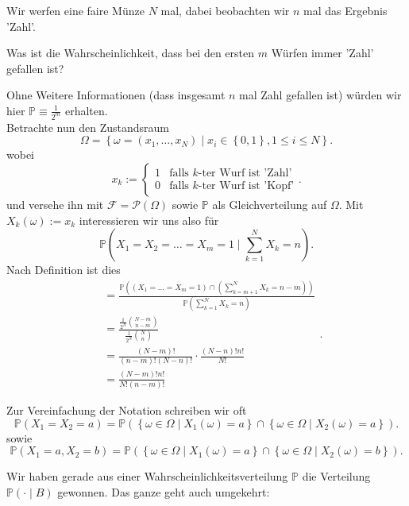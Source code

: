 \begin{example}
    Wir werfen eine faire Münze $N$ mal, dabei beobachten wir $n$ mal das Ergebnis 'Zahl'.
     \begin{question}
        Was ist die Wahrscheinlichkeit, dass bei den ersten $m$ Würfen immer 'Zahl' gefallen ist?
    \end{question}
    Ohne Weitere Informationen (dass insgesamt $n$ mal Zahl gefallen ist) würden wir hier $\mathbb{P} \equiv \frac{1}{2^m}$ erhalten. \\
    Betrachte nun den Zustandsraum
    \[
        \Omega = \left \{\omega = (x_1,\ldots,x_N)\mid x_i \in \left \{0,1\right\},1\leq i\leq N \right\} 
    .\] 
    wobei
    \[
    x_k := \begin{cases}
        1 & \text{falls $k$-ter Wurf ist 'Zahl'} \\
        0 & \text{falls $k$-ter Wurf ist 'Kopf'}
    \end{cases}
    .\] 
    und versehe ihn mit $\mathcal{F} = \mathcal{P}(\Omega)$ sowie $\mathbb{P}$ als Gleichverteilung auf $\Omega$. Mit $X_k(\omega) := x_k$ interessieren wir uns also für
    \[
        \mathbb{P}\left(X_1=X_2=\ldots=X_m =1 \mid  \sum_{k=1}^N X_k  =n\right)
    .\]
    Nach Definition ist dies
    \[
        \begin{split}
        &= \frac{\mathbb{P}\left(\left(X_1=\ldots=X_m = 1\right) \cap  \left(\sum\limits_{k=m+1}^N X_k = n-m\right)\right)}{\mathbb{P}\left(\sum\limits_{k=1}^N X_k = n\right)} \\
        &= \frac{\frac{1}{2^N} \binom{N-m}{n-m}}{\frac{1}{2^N}\binom{N}{n}} \\
        &= \frac{(N-m)!}{(n-m)!(N-n)!} \cdot  \frac{(N-n)! n!}{N!} \\
        &= \frac{(N-m)! n!}{N! (n-m)!}
        \end{split}
    .\] 
\end{example}
\begin{notation}
    Zur Vereinfachung der Notation schreiben wir oft
    \[
    \mathbb{P}(X_1=X_2=a) = \mathbb{P}(\left \{\omega\in \Omega \mid  X_1(\omega) = a\right\} \cap \left\{ \omega\in \Omega \mid X_2(\omega) =a\right\} )
    .\] 
    sowie
    \[
    \mathbb{P}(X_1=a, X_2=b) = \mathbb{P}(\left \{\omega\in \Omega \mid  X_1(\omega) = a \right\} \cap \left\{\omega\in \Omega\mid X_2(\omega)  =b\right\} )
    .\] 
\end{notation}
Wir haben gerade aus einer Wahrscheinlichkeitsverteilung $\mathbb{P}$ die Verteilung $\mathbb{P}(\cdot \mid B)$ gewonnen. Das ganze geht auch umgekehrt:
